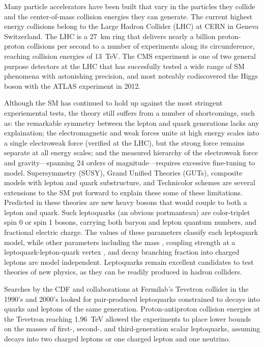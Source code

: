 Many particle accelerators have been built that vary in the particles they collide and the center-of-mass collision energies they can generate. The current highest energy collisions belong to the Large Hadron Collider (LHC) at CERN in Geneva Switzerland. The LHC is a \SI{27}{\km} ring that delivers nearly a billion proton-proton collisions per second to a number of experiments along its circumference, reaching collision energies of \SI{13}{\TeV}. The CMS experiment is one of two general purpose detectors at the LHC that has succesfully tested a wide range of SM phenomena with astonishing precision, and most noteably codiscovered the Higgs boson with the ATLAS experiment in 2012.

Although the SM has continued to hold up against the most stringent experiemental tests, the theory still suffers from a number of shortcomings, such as: the remarkable symmetry between the lepton and quark generations lacks any explaination; the electromagnetic and weak forces unite at high energy scales into a single electroweak force (verified at the LHC), but the strong force remains separate at all energy scales; and the measured hierarchy of the electroweak force and gravity---spanning 24 orders of magnitude---requires excessive fine-tuning to model. Supersymmetry (SUSY), Grand Unified Theories (GUTs), composite models with lepton and quark substructure, and Technicolor schemes are several extensions to the SM put forward to explain these some of these limitations. Predicted in these theories are new heavy bosons that would couple to both a lepton and quark. Such leptoquarks (an obvious portmanteau) are color-triplet spin 0 or spin 1 bosons, carrying both baryon and lepton quantum numbers, and fractional electric charge. The values of these parameters classify each leptoquark model, while other parameters including the mass \MLQ, coupling strength at a leptoquark-lepton-quark vertex \lambdaLQ, and decay branching fraction into charged leptons \bfu are model independent. Leptoquarks remain excellent candidates to test theories of new physics, as they can be readily produced in hadron colliders.

Searches by the CDF and \DZERO collaborations at Fermilab's Tevetron collider in the 1990's and 2000's looked for pair-produced leptoquarks constrained to decays into quarks and leptons of the same generation. Proton-antiproton collision energies at the Tevetron reaching \SI{1.96}{\TeV} allowed the experiments to place lower bounds on the masses of first-, second-, and third-generation scalar leptoquarks, assuming decays into two charged leptons or one charged lepton and one neutrino.

